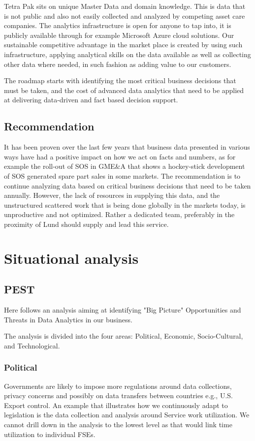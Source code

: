 \documentclass[10pt]{article} %
\begin{document}
Tetra Pak sits on unique Master Data and domain knowledge. This is data that is not public and also not easily collected and analyzed by competing asset care companies. The analytics infrastructure is open for anyone to tap into, it is publicly available through for example Microsoft Azure cloud solutions. Our sustainable competitive advantage in the market place is created by using such infrastructure, applying analytical skills on the data available as well as collecting other data where needed, in such fashion as adding value to our customers. 

The roadmap starts with identifying the most critical business decisions that must be taken, and the cost of advanced data analytics that need to be applied at delivering data-driven and fact based decision support.

\subsection{Recommendation}

It has been proven over the last few years that business data presented in various ways have had a positive impact on how we act on facts and numbers, as for example the roll-out of SOS in GME\&A that shows a hockey-stick development of SOS generated spare part sales in some markets. The recommendation is to continue analyzing data based on critical business decisions that need to be taken annually. However, the lack of resources in supplying this data, and the unstructured scattered work that is being done globally in the markets today, is unproductive and not optimized. Rather a dedicated team, preferably in the proximity of Lund should supply and lead this service.

\section{Situational analysis}
\subsection{PEST}
Here follows an analysis aiming at identifying "Big Picture" Opportunities and Threats in Data Analytics in our business. 

The analysis is divided into the four areas: Political, Economic, Socio-Cultural, and Technological.

\subsubsection{Political}
Governments are likely to impose more regulations around data collections, privacy concerns and possibly on data transfers between countries e.g., U.S. Export control.
An example that illustrates how we continuously adapt to legislation is the data collection and analysis around Service work utilization. We cannot drill down in the analysis to the lowest level as that would link time utilization to individual FSEs.
\end{document}
